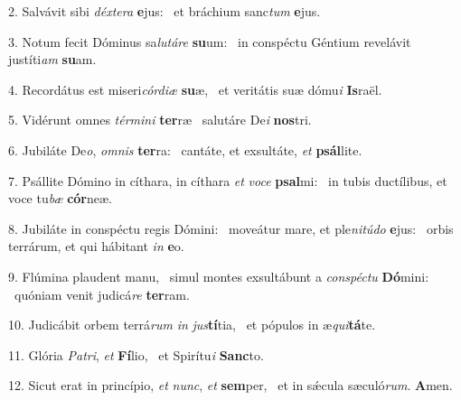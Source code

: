 2. Salvávit sibi \textit{déx}\textit{te}\textit{ra} \textbf{e}jus: \ast\  et bráchium sanc\textit{tum} \textbf{e}jus.\

3. Notum fecit Dóminus sa\textit{lu}\textit{tá}\textit{re} \textbf{su}um: \ast\  in conspéctu Géntium revelávit justíti\textit{am} \textbf{su}am.\

4. Recordátus est miseri\textit{cór}\textit{di}\textit{æ} \textbf{su}æ, \ast\  et veritátis suæ dómu\textit{i} \textbf{Is}raël.\

5. Vidérunt omnes \textit{tér}\textit{mi}\textit{ni} \textbf{ter}ræ \ast\  salutáre De\textit{i} \textbf{nos}tri.\

6. Jubiláte De\textit{o}, \textit{om}\textit{nis} \textbf{ter}ra: \ast\  cantáte, et exsultáte, \textit{et} \textbf{psál}lite.\

7. Psállite Dómino in cíthara, in cíthara \textit{et} \textit{vo}\textit{ce} \textbf{psal}mi: \ast\  in tubis ductílibus, et voce tu\textit{bæ} \textbf{cór}neæ.\

8. Jubiláte in conspéctu regis Dómini: \dag\  moveátur mare, et ple\textit{ni}\textit{tú}\textit{do} \textbf{e}jus: \ast\  orbis terrárum, et qui hábitant \textit{in} \textbf{e}o.\

9. Flúmina plaudent manu, \dag\  simul montes exsultábunt a \textit{con}\textit{spéc}\textit{tu} \textbf{Dó}mini: \ast\  quóniam venit judicá\textit{re} \textbf{ter}ram.\

10. Judicábit orbem terrá\textit{rum} \textit{in} \textit{jus}\textbf{tí}tia, \ast\  et pópulos in æ\textit{qui}\textbf{tá}te.\

11. Glória \textit{Pa}\textit{tri}, \textit{et} \textbf{Fí}lio, \ast\  et Spirítu\textit{i} \textbf{Sanc}to.\

12. Sicut erat in princípio, \textit{et} \textit{nunc}, \textit{et} \textbf{sem}per, \ast\  et in sǽcula sæculó\textit{rum}. \textbf{A}men.\

